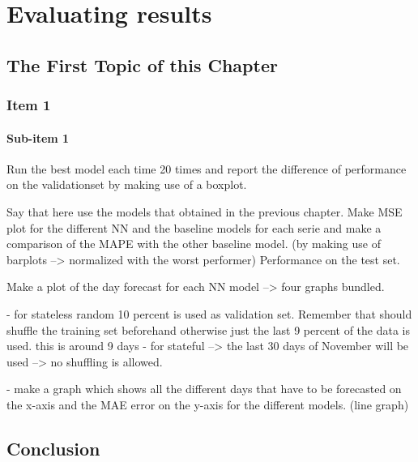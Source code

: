 \chapter{Evaluating results}
\label{cha:Evaluating results}


\section{The First Topic of this Chapter}
\subsection{Item 1}
\subsubsection{Sub-item 1}

Run the best model each time 20 times and report the difference of  performance on the validationset by making use of a boxplot. 


Say that here use the models that obtained in the previous chapter. Make MSE plot for the different NN and the baseline models for each serie and make a comparison of the MAPE with the other baseline model. (by making use of barplots --> normalized with the worst performer) Performance on the test set. 

Make a plot of the day forecast for each NN model --> four graphs bundled. 

- for stateless random 10 percent is used as validation set. Remember that should shuffle the training set beforehand otherwise just the last 9 percent of the data is used. this is around 9 days
- for stateful --> the last 30 days of November will be used --> no shuffling is allowed.

- make a graph which shows all the different days that have to be forecasted on the x-axis and the MAE error on the y-axis for the different models. (line graph)



\section{Conclusion}
\lipsum[86-88]

